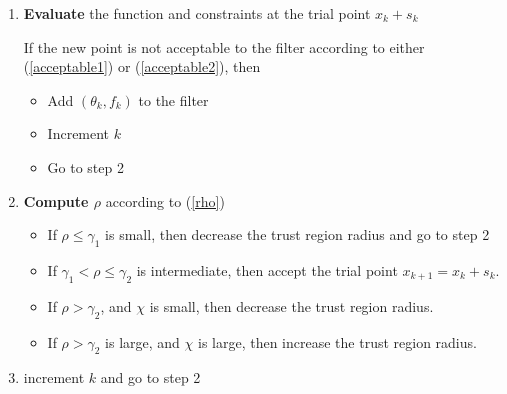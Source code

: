\documentclass{article}
\let\oldref\ref
\renewcommand{\ref}[1]{(\oldref{#1})}
\begin{document}
\begin{enumerate}
\item \textbf{Evaluate} the function and constraints at the trial point $x_k + s_k$

If the new point is not acceptable to the filter according to either \ref{acceptable1} or \ref{acceptable2}, then
\begin{itemize}
\item Add $(\theta_k, f_k)$ to the filter
\item Increment $k$
\item Go to step 2
\end{itemize}

\item \textbf{Compute $\rho$} according to \ref{rho}
\begin{itemize}
\item If $\rho \le \gamma_1$ is small, then decrease the trust region radius and go to step 2
\item If $\gamma_1 < \rho \le \gamma_2$ is intermediate, then accept the trial point $x_{k+1} = x_{k} + s_k$.
\item If $\rho > \gamma_2$, and $\chi$ is small, then decrease the trust region radius.
\item If $\rho > \gamma_2$ is large, and $\chi$ is large, then increase the trust region radius.
\end{itemize}

\item increment $k$ and go to step 2
\end{enumerate}
\FloatBarrier

\underline{\hspace{20cm}}




\end{document}
